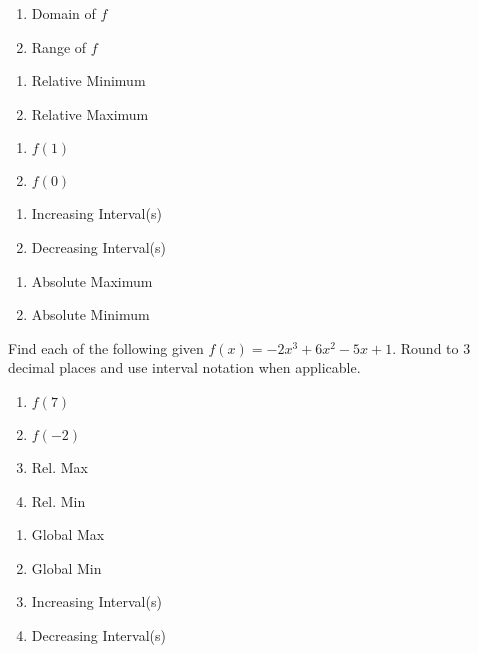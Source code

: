 \begin{multicols}{2}
\begin{enumerate}
\item Domain of $f$
\item Range of $f$
\end{enumerate}	\setcounter{Review}{\value{enumi}}
\end{multicols}
\begin{multicols}{2}
\begin{enumerate}	\setcounter{enumi}{\value{Review}}
\item Relative Minimum
\item Relative Maximum
\end{enumerate}	\setcounter{Review}{\value{enumi}}
\end{multicols}
\begin{multicols}{2}
\begin{enumerate}	\setcounter{enumi}{\value{Review}}
\item $f(1)$
\item $f(0)$
\end{enumerate}	\setcounter{Review}{\value{enumi}}
\end{multicols}
\begin{multicols}{2}
\begin{enumerate}	\setcounter{enumi}{\value{Review}}
\item Increasing Interval(s)
\item Decreasing Interval(s)
\end{enumerate}	\setcounter{Review}{\value{enumi}}
\end{multicols}
\begin{multicols}{2}
\begin{enumerate}	\setcounter{enumi}{\value{Review}}
\item Absolute Maximum
\item Absolute Minimum
\setcounter{Review}{\value{enumi}}
\end{enumerate}
\end{multicols}
\bigskip 

Find each of the following given $f(x) = -2x^{3}+6x^{2}-5x+1$. Round to 3 decimal places and use interval notation when applicable.
\begin{multicols}{4}
\begin{enumerate}
\setcounter{enumi}{\value{Review}}
\item $f(7)$
\item $f(-2)$
\item Rel. Max
\item Rel. Min
\end{enumerate}	\setcounter{Review}{\value{enumi}}
\end{multicols}
\begin{multicols}{4}
\begin{enumerate}	\setcounter{enumi}{\value{Review}}
\item Global Max
\item Global Min
\item Increasing Interval(s)
\item Decreasing Interval(s)
\setcounter{Review}{\value{enumi}}
\end{enumerate}
\end{multicols}
\bigskip 

